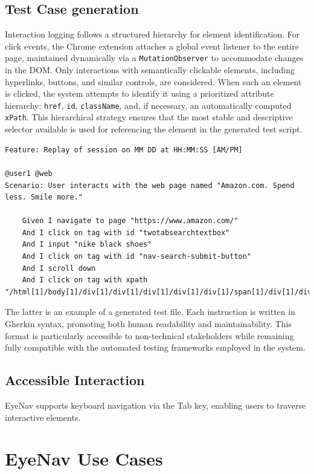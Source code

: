 \subsection{Test Case generation}

Interaction logging follows a structured hierarchy for element identification. For click events, the Chrome extension attaches a global event listener to the entire page, maintained dynamically via a \verb|MutationObserver| to accommodate changes in the DOM. Only interactions with semantically clickable elements, including hyperlinks, buttons, and similar controls, are considered. When such an element is clicked, the system attempts to identify it using a prioritized attribute hierarchy: \verb|href|, \verb|id|, \verb|className|, and, if necessary, an automatically computed \verb|xPath|. This hierarchical strategy ensures that the most stable and descriptive selector available is used for referencing the element in the generated test script.


\begin{lstlisting}
Feature: Replay of session on MM DD at HH:MM:SS [AM/PM]

@user1 @web
Scenario: User interacts with the web page named "Amazon.com. Spend less. Smile more."

    Given I navigate to page "https://www.amazon.com/"
    And I click on tag with id "twotabsearchtextbox"
    And I input "nike black shoes"
    And I click on tag with id "nav-search-submit-button"
    And I scroll down
    And I click on tag with xpath "/html[1]/body[1]/div[1]/div[1]/div[1]/div[1]/div[1]/span[1]/div[1]/div[9]/div[1]/div[1]/span[1]/div[1]/div[1]/div[1]/span[1]/a[1]/div[1]"
\end{lstlisting}

The latter is an example of a generated test file. Each instruction is written in Gherkin syntax, promoting both human readability and maintainability. This format is particularly accessible to non-technical stakeholders while remaining fully compatible with the automated testing frameworks employed in the system.

\subsection{Accessible Interaction}
EyeNav supports keyboard navigation via the Tab key, enabling users to traverse interactive elements.

\section{EyeNav Use Cases}

